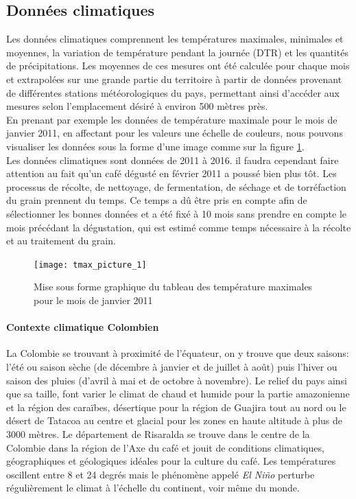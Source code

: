  
\subsection{Données climatiques}
Les données climatiques comprennent les températures maximales, minimales et moyennes, la variation de température pendant la journée (DTR) et les quantités de précipitations. Les moyennes de ces mesures ont été calculée pour chaque mois et extrapolées sur une grande partie du territoire à partir de données provenant de différentes stations météorologiques du pays, permettant ainsi d’accéder aux mesures selon l’emplacement désiré à environ 500 mètres près. \\

\noindent En prenant par exemple les données de température maximale pour le mois de janvier 2011, en affectant pour les valeurs une échelle de couleurs, nous pouvons visualiser les données sous la forme d'une image comme sur la figure \ref{tmax_picture}.\\

\noindent Les données climatiques sont données de 2011 à 2016. il faudra cependant faire attention au fait qu'un café dégusté en février 2011 a poussé bien plus tôt. Les processus de récolte, de nettoyage, de fermentation, de séchage et de torréfaction du grain prennent du temps. Ce temps a dû être pris en compte afin de sélectionner les bonnes données et a été fixé à 10 mois sans prendre en compte le mois précédant la dégustation, qui est estimé comme temps nécessaire à la récolte et au traitement du grain. 


\begin{figure}[H]
	\centering
	\texttt{[image: tmax\_picture\_1]}
	\caption{\label{tmax_picture} Mise sous forme graphique du tableau des température maximales pour le mois de janvier 2011 }
\end{figure}

\paragraph{Contexte climatique Colombien}La Colombie se trouvant à proximité de l'équateur, on y trouve que deux saisons: l'été ou saison sèche (de décembre à janvier et de juillet à août) puis l'hiver ou saison des pluies (d'avril à mai et de octobre à novembre). Le relief du pays ainsi que sa taille, font varier le climat de chaud et humide pour la partie amazonienne et la région des caraïbes, désertique pour la région de Guajira tout au nord ou le désert de Tatacoa au centre et glacial pour les zones en haute altitude à plus de 3000 mètres. Le département de Risaralda se trouve dans le centre de la Colombie dans la région de l'Axe du café et jouit de conditions climatiques, géographiques et géologiques idéales pour la culture du café. Les températures oscillent entre 8 et 24 degrés mais le phénomène appelé \textit{El Niño} perturbe régulièrement le climat à l'échelle du continent, voir même du monde. 

